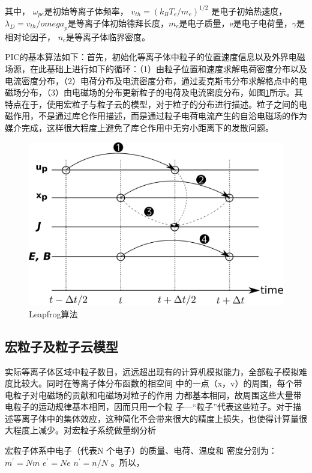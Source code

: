   
其中， $\omega_{pe}$是初始等离子体频率， $v_{th}=(k_B T_e / m_e)^{1/2}$ 是电子初始热速度， $\lambda_D=v_{th}/ {omega}_p$是等离子体初始德拜长度，$m_e$是电子质量，e是电子电荷量，$\gamma$是相对论因子， $n_c$是等离子体临界密度。
  


PIC的基本算法如下：首先，初始化等离子体中粒子的位置速度信息以及外界电磁场源，在此基础上进行如下的循环：（1）由粒子位置和速度求解电荷密度分布以及电流密度分布，（2）电荷分布及电流密度分布，通过麦克斯韦分布求解格点中的电磁场分布，（3）由电磁场的分布更新粒子的电荷及电流密度分布，如图\ref{fig:Leapfrog}所示。其特点在于，使用宏粒子与粒子云的模型，对于粒子的分布进行描述。粒子之间的电磁作用，不是通过库仑作用描述，而是通过粒子电荷电流产生的自洽电磁场的作为媒介完成，这样很大程度上避免了库仑作用中无穷小距离下的发散问题。
\begin{figure}[!htbp]
  \centering
  \includegraphics[width=\MyFactor\textwidth]{Img/leapfrog.eps}
  \caption{Leapfrog算法}
  \label{fig:Leapfrog}
\end{figure}

\subsection{宏粒子及粒子云模型}
实际等离子体区域中粒子数目，远远超出现有的计算机模拟能力，全部粒子模拟难度比较大。同时在等离子体分布函数的相空间
中的一点（x，v）的周围，每个带电粒子对电磁场的贡献和电磁场对粒子的作用
力都基本相同，故周围这些大量带电粒子的运动规律基本相同，因而只用一个粒
子---“粒子”代表这些粒子。对于描述等离子体中的集体效应，这种简化不会带来很大的精度上损失，也使得计算量很大程度上减少。对宏粒子系统做量纲分析


宏粒子体系中电子（代表N 个电子）的质量、电荷、温度和
密度分别为：$m^'=Nm$ $e^'=Ne$  $n^'=n/N$ 。所以，


